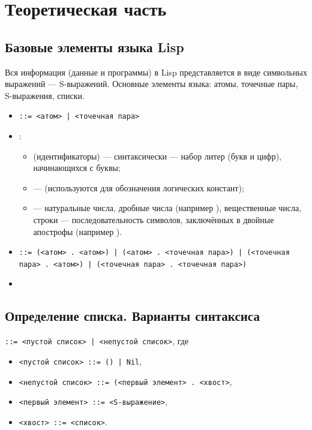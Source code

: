 \documentclass[a4paper]{report}
\begin{document}
\section*{Теоретическая часть}

\subsection*{Базовые элементы языка Lisp}

Вся информация (данные и программы) в Lisp представляется в виде символьных выражений — S-выражений.
Основные элементы языка: атомы, точечные пары, S-выражения, списки.
\begin{itemize}
	\item {} \texttt{::= <атом> | <точечная пара>}
	\item {}:
	\begin{itemize}
		\item {} (идентификаторы) — синтаксически — набор литер (букв и цифр), начинающихся с буквы;
		\item {} —  (используются для обозначения логических констант);
		\item {} — натуральные числа, дробные числа (например ), вещественные числа, строки — последовательность символов, заключённых в двойные апострофы (например ).
	\end{itemize}

	\item {} \texttt{::= (<атом> . <атом>) | (<атом> . <точечная пара>) | (<точечная пара> . <атом>) | (<точечная пара> . <точечная пара>)}
	
	\item {}
\end{itemize}

\subsection*{Определение списка. Варианты синтаксиса}

 \texttt{::= <пустой список> | <непустой список>}, где
\begin{itemize}
	\item \texttt{<пустой список> ::= () | Nil},
	\item \texttt{<непустой список> ::= (<первый элемент> . <хвост>},
	\item \texttt{<первый элемент> ::= <S-выражение>},
	\item \texttt{<хвост> ::= <список>}.
\end{itemize}
\end{document}
